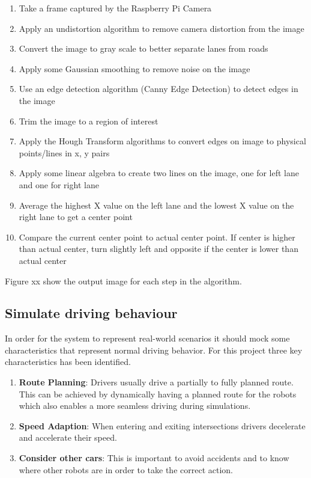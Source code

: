 \begin{enumerate}
    \item Take a frame captured by the Raspberry Pi Camera
    \item Apply an undistortion algorithm to remove camera distortion from the image
    \item Convert the image to gray scale to better separate lanes from roads
    \item Apply some Gaussian smoothing to remove noise on the image
    \item Use an edge detection algorithm (Canny Edge Detection) to detect edges in the image
    \item Trim the image to a region of interest
    \item Apply the Hough Transform algorithms to convert edges on image to physical points/lines in x, y pairs
    \item Apply some linear algebra to create two lines on the image, one for left lane and one for right lane
    \item Average the highest X value on the left lane and the lowest X value on the right lane to get a center point
    \item Compare the current center point to actual center point. If center is higher than actual center, turn slightly left and opposite if the center is lower than actual center
\end{enumerate}

\noindent Figure xx show the output image for each step in the algorithm.

\subsection{Simulate driving behaviour}
In order for the system to represent real-world scenarios it should mock some characteristics that represent normal driving behavior. For this project three key characteristics has been identified. 

\begin{enumerate}
\item \textbf{Route Planning}: Drivers usually drive a partially to fully planned route. This can be achieved by dynamically having a planned route for the robots which also enables a more seamless driving during simulations. 
\item \textbf{Speed Adaption}: When entering and exiting intersections drivers decelerate and accelerate their speed. 
\item \textbf{Consider other cars}: This is important to avoid accidents and to know where other robots are in order to take the correct action.
\end{enumerate}